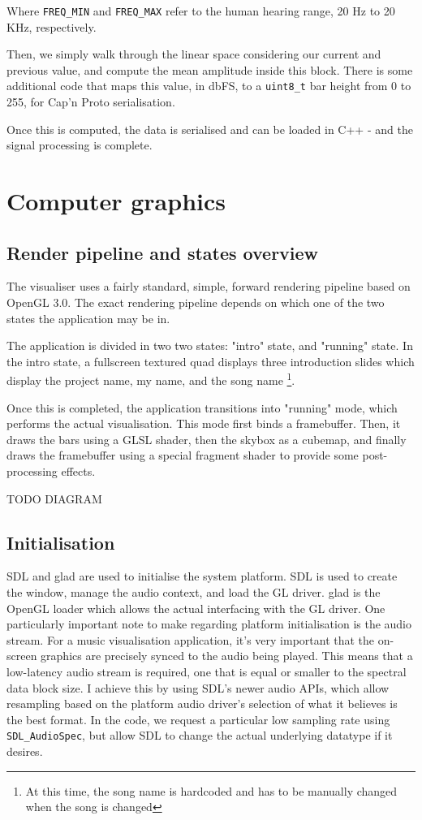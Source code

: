 \documentclass[11pt]{article}
\begin{document}
Where \verb|FREQ_MIN| and \verb|FREQ_MAX| refer to the human hearing range, 20 Hz to 20 KHz, respectively.

Then, we simply walk through the linear space considering our current and previous value, and compute the mean
amplitude inside this block. There is some additional code that maps this value, in dbFS, to a \verb|uint8_t|
bar height from 0 to 255, for Cap'n Proto serialisation.

Once this is computed, the data is serialised and can be loaded in C++ - and the signal processing is
complete.

\section{Computer graphics}
\subsection{Render pipeline and states overview}
The visualiser uses a fairly standard, simple, forward rendering pipeline based on OpenGL 3.0. The exact
rendering pipeline depends on which one of the two states the application may be in.

The application is divided in two two states: "intro" state, and "running" state. In the intro state, a
fullscreen textured quad displays three introduction slides which display the project name, my name, and the
song name \footnote{At this time, the song name is hardcoded and has to be manually changed when the song is
changed}.

Once this is completed, the application transitions into "running" mode, which performs the actual
visualisation. This mode first binds a framebuffer. Then, it draws the bars using a GLSL shader, then the
skybox as a cubemap, and finally draws the framebuffer using a special fragment shader to provide some
post-processing effects.

TODO DIAGRAM

\subsection{Initialisation}
SDL and glad are used to initialise the system platform. SDL is used to create the window, manage the audio
context, and load the GL driver. glad is the OpenGL loader which allows the actual interfacing with the GL
driver. One particularly important note to make regarding platform initialisation is the audio stream. For a
music visualisation application, it's very important that the on-screen graphics are precisely synced to the
audio being played. This means that a low-latency audio stream is required, one that is equal or smaller to
the spectral data block size. I achieve this by using SDL's newer audio APIs, which allow resampling based on
the platform audio driver's selection of what it believes is the best format. In the code, we request a
particular low sampling rate using \verb|SDL_AudioSpec|, but allow SDL to change the actual underlying
datatype if it desires.
\end{document}
